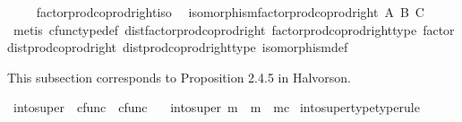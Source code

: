\begin{isabellebody}
\endisatagproof
{\isafoldproof}%
%
\isadelimproof
\isanewline
%
\endisadelimproof
\ \ \ \isanewline
{}\isamarkupfalse%
\ factor{\isacharunderscore}{\kern0pt}prod{\isacharunderscore}{\kern0pt}coprod{\isacharunderscore}{\kern0pt}right{\isacharunderscore}{\kern0pt}iso{\isacharcolon}{\kern0pt}\isanewline
\ \ {\isachardoublequoteopen}isomorphism{\isacharparenleft}{\kern0pt}factor{\isacharunderscore}{\kern0pt}prod{\isacharunderscore}{\kern0pt}coprod{\isacharunderscore}{\kern0pt}right\ A\ B\ C{\isacharparenright}{\kern0pt}{\isachardoublequoteclose}\isanewline
%
\isadelimproof
\ \ %
\endisadelimproof
%
\isatagproof
{}\isamarkupfalse%
\ {\isacharparenleft}{\kern0pt}metis\ cfunc{\isacharunderscore}{\kern0pt}type{\isacharunderscore}{\kern0pt}def\ dist{\isacharunderscore}{\kern0pt}factor{\isacharunderscore}{\kern0pt}prod{\isacharunderscore}{\kern0pt}coprod{\isacharunderscore}{\kern0pt}right\ factor{\isacharunderscore}{\kern0pt}prod{\isacharunderscore}{\kern0pt}coprod{\isacharunderscore}{\kern0pt}right{\isacharunderscore}{\kern0pt}type\ factor{\isacharunderscore}{\kern0pt}dist{\isacharunderscore}{\kern0pt}prod{\isacharunderscore}{\kern0pt}coprod{\isacharunderscore}{\kern0pt}right\ dist{\isacharunderscore}{\kern0pt}prod{\isacharunderscore}{\kern0pt}coprod{\isacharunderscore}{\kern0pt}right{\isacharunderscore}{\kern0pt}type\ isomorphism{\isacharunderscore}{\kern0pt}def{\isacharparenright}{\kern0pt}%
\endisatagproof
{\isafoldproof}%
%
\isadelimproof
%
\endisadelimproof
%
\isadelimdocument
%
\endisadelimdocument
%
\isatagdocument
%
\isamarkuptrue%
%
\isamarkuptrue%
%
\endisatagdocument
{\isafolddocument}%
%
\isadelimdocument
%
\endisadelimdocument
%
\begin{isamarkuptext}%
This subsection corresponds to Proposition 2.4.5 in Halvorson.%
\end{isamarkuptext}\isamarkuptrue%
\isamarkupfalse%
\ into{\isacharunderscore}{\kern0pt}super\ {\isacharcolon}{\kern0pt}{\isacharcolon}{\kern0pt}\ {\isachardoublequoteopen}cfunc\ {\isasymRightarrow}\ cfunc{\isachardoublequoteclose}\ \isanewline
\ \ {\isachardoublequoteopen}into{\isacharunderscore}{\kern0pt}super\ m\ {\isacharequal}{\kern0pt}\ m\ {\isasymamalg}\ m\isactrlsup c{\isachardoublequoteclose}\isanewline
\isanewline
{}\isamarkupfalse%
\ into{\isacharunderscore}{\kern0pt}super{\isacharunderscore}{\kern0pt}type{\isacharbrackleft}{\kern0pt}type{\isacharunderscore}{\kern0pt}rule{\isacharbrackright}{\kern0pt}{\isacharcolon}{\kern0pt}\isanewline

\end{isabellebody}
